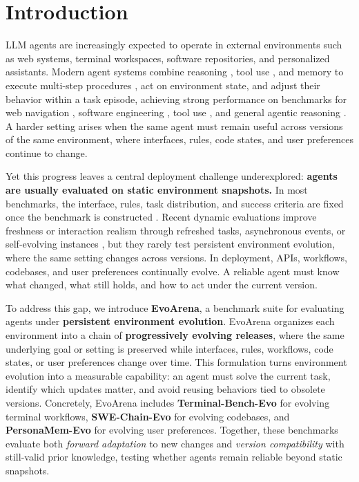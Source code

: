 \documentclass{llmxive}
\begin{document}
\section{Introduction}
\vspace{-1mm}

LLM agents are increasingly expected to operate in external environments such as web systems, terminal workspaces, software repositories, and personalized assistants. Modern agent systems combine reasoning \cite{react}, tool use \cite{memento-s}, and memory to execute multi-step procedures \cite{xu2025amem}, act on environment state, and adjust their behavior within a task episode, achieving strong performance on benchmarks for web navigation \cite{zhou2023webarena}, software engineering \cite{jimenez2024swebench}, tool use \cite{mialon2024gaia}, and general agentic reasoning \cite{mialon2024gaia}. A harder setting arises when the same agent must remain useful across versions of the same environment, where interfaces, rules, code states, and user preferences continue to change.



Yet this progress leaves a central deployment challenge underexplored: \textbf{agents are usually evaluated on static environment snapshots.} In most benchmarks, the interface, rules, task distribution, and success criteria are fixed once the benchmark is constructed \cite{jimenez2024swebench,liu2024agentbench,mialon2024gaia,zhou2023webarena}. Recent dynamic evaluations improve freshness or interaction realism through refreshed tasks, asynchronous events, or self-evolving instances \cite{gaia2,li2026swe-benchl-ive,benchmark-selfevolv}, but they rarely test persistent environment evolution, where the same setting changes across versions. In deployment, APIs, workflows, codebases, and user preferences continually evolve. A reliable agent must know what changed, what still holds, and how to act under the current version.




To address this gap, we introduce \textbf{EvoArena}, a benchmark suite for evaluating agents under \textbf{persistent environment evolution}. EvoArena organizes each environment into a chain of \textbf{progressively evolving releases}, where the same underlying goal or setting is preserved while interfaces, rules, workflows, code states, or user preferences change over time. This formulation turns environment evolution into a measurable capability: an agent must solve the current task, identify which updates matter, and avoid reusing behaviors tied to obsolete versions. Concretely, EvoArena includes \textbf{Terminal-Bench-Evo} for evolving terminal workflows,  \textbf{SWE-Chain-Evo} for evolving codebases, and \textbf{PersonaMem-Evo} for evolving user preferences. Together, these benchmarks evaluate both \textit{forward adaptation} to new changes and \textit{version compatibility} with still-valid prior knowledge, testing whether agents remain reliable beyond static snapshots.
\end{document}
